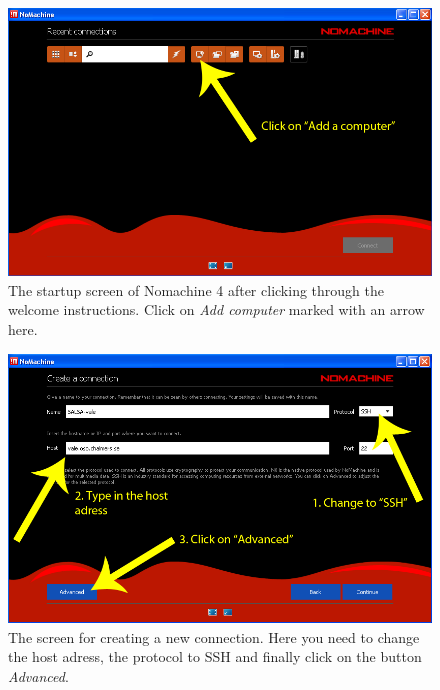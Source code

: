 \begin{figure}[H]
    \centering
    \includegraphics[height=0.25\paperheight]{../figures/nomachinefigs/fig1_recentconn.png}
    \caption{The startup screen of Nomachine 4 after clicking through the welcome instructions. Click on \emph{Add computer} marked with an arrow here.}
    \label{fig:recentconn}
\end{figure}

\begin{figure}[H]
    \centering
    \includegraphics[height=0.25\paperheight]{../figures/nomachinefigs/fig2_create.png}
    \caption{The screen for creating a new connection. Here you need to change the host adress, the protocol to SSH and finally click on the button \emph{Advanced}.}
    \label{fig:create}
\end{figure}

